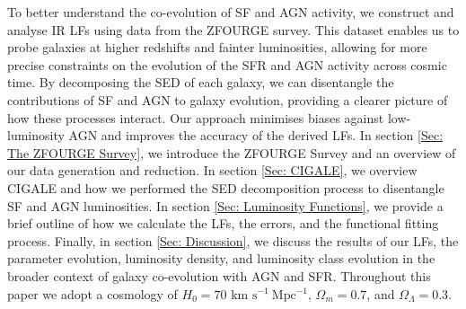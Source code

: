 To better understand the co-evolution of SF and AGN activity, we construct and analyse IR LFs using data from the ZFOURGE survey. This dataset enables us to probe galaxies at higher redshifts and fainter luminosities, allowing for more precise constraints on the evolution of the SFR and AGN activity across cosmic time. By decomposing the SED of each galaxy, we can disentangle the contributions of SF and AGN to galaxy evolution, providing a clearer picture of how these processes interact. Our approach minimises biases against low-luminosity AGN and improves the accuracy of the derived LFs. In section \ref{Sec: The ZFOURGE Survey}, we introduce the ZFOURGE Survey and an overview of our data generation and reduction. In section \ref{Sec: CIGALE}, we overview CIGALE and how we performed the SED decomposition process to disentangle SF and AGN luminosities. In section \ref{Sec: Luminosity Functions}, we provide a brief outline of how we calculate the LFs, the errors, and the functional fitting process. Finally, in section \ref{Sec: Discussion}, we discuss the results of our LFs, the parameter evolution, luminosity density, and luminosity class evolution in the broader context of galaxy co-evolution with AGN and SFR. Throughout this paper we adopt a cosmology of $H_0 = 70$ km $\mathrm{s^{-1}\ Mpc^{-1}}$, $\Omega_m=0.7$, and $\Omega_\Lambda=0.3$.




